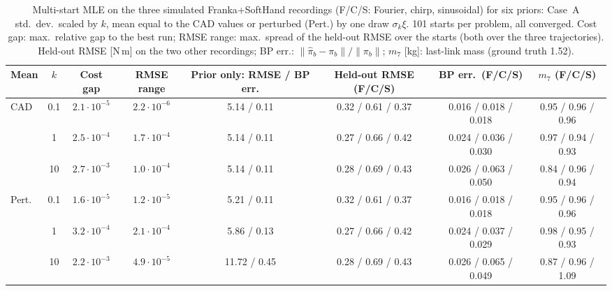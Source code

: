 \begin{table}[t]
\caption{Multi-start MLE on the three simulated Franka+SoftHand recordings (F/C/S: Fourier, chirp, sinusoidal) for six priors: Case~A std.\ dev.\ scaled by $k$, mean equal to the CAD values or perturbed (Pert.) by one draw $\sigma_k\xi$. 101 starts per problem, all converged. Cost gap: max.\ relative gap to the best run; RMSE range: max.\ spread of the held-out RMSE over the starts (both over the three trajectories). Held-out RMSE [N\,m] on the two other recordings; BP err.: $\|\hat{\pi}_b-\pi_b\|/\|\pi_b\|$; $m_7$ [kg]: last-link mass (ground truth 1.52).}
\label{tab:multistart_softhand}
\centering\footnotesize\setlength{\tabcolsep}{4pt}
\begin{tabular}{lccccccc}
\toprule
Mean & $k$ & Cost gap & RMSE range & Prior only: RMSE / BP err. & Held-out RMSE (F/C/S) & BP err.\ (F/C/S) & $m_7$ (F/C/S)\\
\midrule
\multirow{3}{*}{CAD} & 0.1 & $2.1\cdot10^{-5}$ & $2.2\cdot10^{-6}$ & 5.14 / 0.11 & 0.32 / 0.61 / 0.37 & 0.016 / 0.018 / 0.018 & 0.95 / 0.96 / 0.96 \\
 & 1 & $2.5\cdot10^{-4}$ & $1.7\cdot10^{-4}$ & 5.14 / 0.11 & 0.27 / 0.66 / 0.42 & 0.024 / 0.036 / 0.030 & 0.97 / 0.94 / 0.93 \\
 & 10 & $2.7\cdot10^{-3}$ & $1.0\cdot10^{-4}$ & 5.14 / 0.11 & 0.28 / 0.69 / 0.43 & 0.026 / 0.063 / 0.050 & 0.84 / 0.96 / 0.94 \\
\midrule
\multirow{3}{*}{Pert.} & 0.1 & $1.6\cdot10^{-5}$ & $1.2\cdot10^{-5}$ & 5.21 / 0.11 & 0.32 / 0.61 / 0.37 & 0.016 / 0.018 / 0.018 & 0.95 / 0.96 / 0.96 \\
 & 1 & $3.2\cdot10^{-4}$ & $2.1\cdot10^{-4}$ & 5.86 / 0.13 & 0.27 / 0.66 / 0.42 & 0.024 / 0.037 / 0.029 & 0.98 / 0.95 / 0.93 \\
 & 10 & $2.2\cdot10^{-3}$ & $4.9\cdot10^{-5}$ & 11.72 / 0.45 & 0.28 / 0.69 / 0.43 & 0.026 / 0.065 / 0.049 & 0.87 / 0.96 / 1.09 \\
\bottomrule
\end{tabular}
\end{table}
